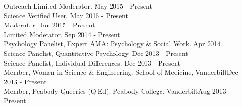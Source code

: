 \documentclass {resume}
\begin{document}
\begin{rSection}{\textrm{Outreach}}
Limited Moderator. \href{http://www.reddit.com/r/Science}{\color{blue}{Science, Reddit.com}}\hfill  {May 2015 - Present}\smallskip\\
Science Verified User. \href{http://www.reddit.com/r/science}{\color{blue}{Science, Reddit.com}}\hfill {May 2015 - Present}\smallskip\\
Moderator. \href{http://www.reddit.com/r/GradAdmissions}{\color{blue}{GradAdmissions, Reddit.com}}\hfill{Jan 2015 - Present}\smallskip\\
Limited Moderator. \href{http://www.reddit.com/r/AskScience}{\color{blue}{AskScience, Reddit.com}}\hfill  {Sep 2014 - Present}\smallskip\\
Psychology Panelist, Expert AMA: Psychology \& Social Work.  \href{http://www.reddit.com/r/AskSocialScience}{\color{blue}{AskSocialScience, Reddit.com}}\hfill{Apr 2014}\smallskip\\
Science Panelist, Quantitative Psychology.  \href{http://www.reddit.com/r/AskScience}{\color{blue}{AskScience, Reddit.com}}\hfill  {Dec 2013 - Present}\smallskip\\%
Science Panelist, Individual Differences.  \href{http://www.reddit.com/r/AskSocialScience}{\color{blue}{AskSocialScience, Reddit.com}}\hfill  {Dec 2013 - Present}\smallskip\\
Member, Women in Science \& Engineering. School of Medicine, Vanderbilt\hfill  {Dec 2013 - Present}\smallskip\\%
Member, Peabody Queeries (Q.Ed). Peabody College, Vanderbilt\hfill  {Aug 2013 - Present}%
\end{rSection}
\end{document}
